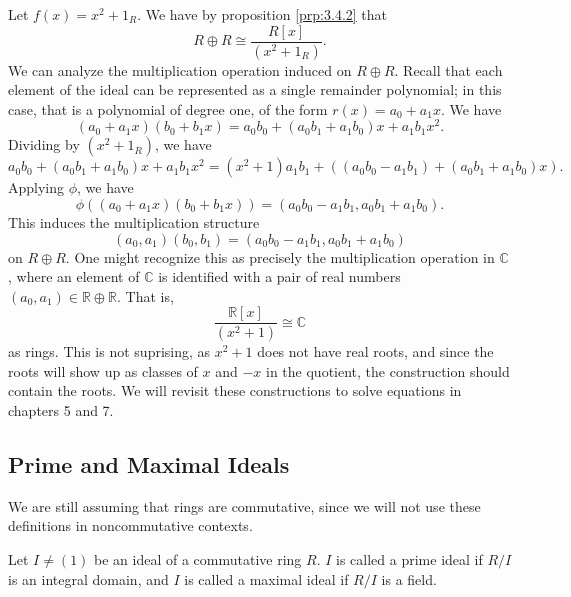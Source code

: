Let $f(x)=x^2 + 1_R$. We have by proposition \ref{prp:3.4.2} that
\[
	R \oplus R \cong \frac{R[x]}{(x^2 + 1_R)}
.\]
We can analyze the multiplication operation induced on $R\oplus R$. Recall that each element of the ideal can be represented as a single remainder polynomial; in this case, that is a polynomial of degree one, of the form $r(x)=a_0 + a_1x$. We have
\[
	(a_0+a_1x)(b_0+b_1x)=a_0b_0 + (a_0b_1+a_1b_0)x+a_1b_1x^2
.\]
Dividing by $(x^2+1_R)$, we have
\[
	a_0b_0+(a_0b_1+a_1b_0)x+a_1b_1x^2 = \left( x^2+1 \right)a_1b_1 + ((a_0b_0-a_1b_1)+(a_0b_1+a_1b_0)x)
.\]
Applying $\phi $, we have
\[
	\phi (\left( a_0+a_1x \right) \left( b_0+b_1x \right) )=\left( a_0b_0-a_1b_1,a_0b_1+a_1b_0 \right) 
.\]
This induces the multiplication structure
\[
	(a_0,a_1)(b_0,b_1)=(a_0b_0-a_1b_1,a_0b_1+a_1b_0)
\]
on $R\oplus R$. One might recognize this as precisely the multiplication operation in $\mathbb{C}$, where an element of $\mathbb{C}$ is identified with a pair of real numbers $(a_0,a_1)\in \mathbb{R}\oplus \mathbb{R}$. That is,
\[
	\frac{\mathbb{R}[x]}{(x^2+1)}\cong \mathbb{C}
\]
as rings. This is not suprising, as $x^2+1$ does not have real roots, and since the roots will show up as classes of $x$ and $-x$ in the quotient, the construction should contain the roots. We will revisit these constructions to solve equations in chapters 5 and 7.

\subsection{Prime and Maximal Ideals}
We are still assuming that rings are commutative, since we will not use these definitions in noncommutative contexts.
\begin{definition}\label{dfn:3.4.4}
	Let $I\neq (1)$ be an ideal of a commutative ring $R$. $I$ is called a prime ideal if $R /I$ is an integral domain, and $I$ is called a maximal ideal if $R /I$ is a field.
\end{definition}

